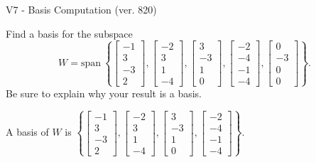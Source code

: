 \begin{exercise}
  \begin{exerciseTitle}V7 - Basis Computation (ver. 820)\end{exerciseTitle}
  \begin{exerciseStatement}
    Find a basis for the subspace 
\[W=\mathrm{span}\ \left\{\left[\begin{array}{r}
-1 \\
3 \\
-3 \\
2
\end{array}\right] , \left[\begin{array}{r}
-2 \\
3 \\
1 \\
-4
\end{array}\right] , \left[\begin{array}{r}
3 \\
-3 \\
1 \\
0
\end{array}\right] , \left[\begin{array}{r}
-2 \\
-4 \\
-1 \\
-4
\end{array}\right] , \left[\begin{array}{r}
0 \\
-3 \\
0 \\
0
\end{array}\right]\right\}.\]
 Be sure to explain why your result is a basis.


  \end{exerciseStatement}
  \begin{exerciseAnswer}
   A basis of \(W\) is  \(\left\{\left[\begin{array}{r}
-1 \\
3 \\
-3 \\
2
\end{array}\right] , \left[\begin{array}{r}
-2 \\
3 \\
1 \\
-4
\end{array}\right] , \left[\begin{array}{r}
3 \\
-3 \\
1 \\
0
\end{array}\right] , \left[\begin{array}{r}
-2 \\
-4 \\
-1 \\
-4
\end{array}\right]\right\}\).
  


  \end{exerciseAnswer}
\end{exercise}